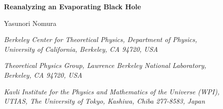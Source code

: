 \documentclass[12pt]{article}
\begin{document}
\def\bra#1{\langle #1 |}
\def\ket#1{| #1 \rangle}
\def\inner#1#2{\langle #1 | #2 \rangle}
\def\brac#1{\llangle #1 \|}
\def\ketc#1{\| #1 \rrangle}
\def\innerc#1#2{\llangle #1 \| #2 \rrangle}
\def\app#1#2{%
  \mathrel{%
    \setbox0=\hbox{$#1\sim$}%
    \setbox2=\hbox{%
      \rlap{\hbox{$#1\propto$}}%
      \lower1.1\ht0\box0%
    }%
    \raise0.25\ht2\box2%
  }%
}
\def\approxprop{\mathpalette\app\relax}
\DeclarePairedDelimiter{\norm}{\lVert}{\rVert}

\begin{titlepage}

\begin{flushright}
\end{flushright}

\vskip 1.2cm

\begin{center}
{\Large \bf Reanalyzing an Evaporating Black Hole}

\vskip 0.7cm

{\large Yasunori Nomura}

\vskip 0.5cm

{\it Berkeley Center for Theoretical Physics, Department of Physics,\\
  University of California, Berkeley, CA 94720, USA}

\vskip 0.1cm

{\it Theoretical Physics Group, Lawrence Berkeley National Laboratory,\\
 Berkeley, CA 94720, USA}

\vskip 0.1cm

{\it Kavli Institute for the Physics and Mathematics of the Universe 
 (WPI),\\
 UTIAS, The University of Tokyo, Kashiwa, Chiba 277-8583, Japan}

\vskip 0.7cm


\end{center}
\end{titlepage}
\end{document}
